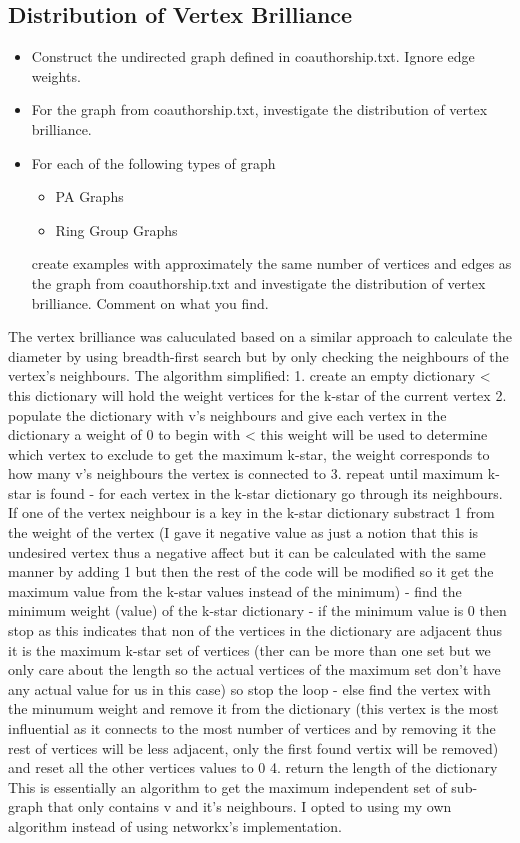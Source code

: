 \documentclass[11pt,a4paper,notitlepage]{article}
\begin{document}
\subsection*{Distribution of Vertex Brilliance}
\begin{itemize}
    \item Construct the undirected graph defined in coauthorship.txt. Ignore edge weights.
    \item For the graph from coauthorship.txt, investigate the distribution of vertex brilliance. 
    \item For each of the following types of graph
    \begin{itemize}
    \item PA Graphs
    \item Ring Group Graphs 
    \end{itemize}
    create examples with approximately the same number of vertices and edges as the graph from coauthorship.txt and investigate the distribution of vertex brilliance. Comment on what you find.
\end{itemize}
The vertex brilliance was caluculated based on a similar approach to calculate the diameter by using breadth-first search but by only checking the neighbours of the vertex's neighbours. The algorithm simplified:
     1. create an empty dictionary < this dictionary will hold the weight vertices for the k-star of the current vertex 
     2. populate the dictionary with v's neighbours and give each vertex in the dictionary a weight of 0 to begin with < this weight will be used to determine which vertex to exclude to get the maximum k-star, the weight corresponds to how many v's neighbours the vertex is connected to
     3. repeat until maximum k-star is found
            - for each vertex in the k-star dictionary go through its neighbours. If one of the vertex neighbour is a key in the k-star dictionary substract 1 from the weight of the vertex (I gave it negative value as just a notion that this is undesired vertex thus a negative affect but it can be calculated with the same manner by adding 1 but then the rest of the code will be modified so it get the maximum value from the k-star values instead of the minimum)
            - find the minimum weight (value) of the k-star dictionary 
            - if the minimum value is 0 then stop as this indicates that non of the vertices in the dictionary are adjacent thus it is the maximum k-star set of vertices (ther can be more than one set but we only care about the length so the actual vertices of the maximum set don't have any actual value for us in this case) so stop the loop
            - else find the vertex with the minumum weight and remove it from the dictionary (this vertex is the most influential as it connects to the most number of vertices and by removing it the rest of vertices will be less adjacent, only the first found vertix will be removed) and reset all the other vertices values to 0 
    4. return the length of the dictionary 
This is essentially an algorithm to get the maximum independent set of sub-graph that only contains v and it's neighbours. I opted to using my own algorithm instead of using networkx's implementation. 
\end{document}
